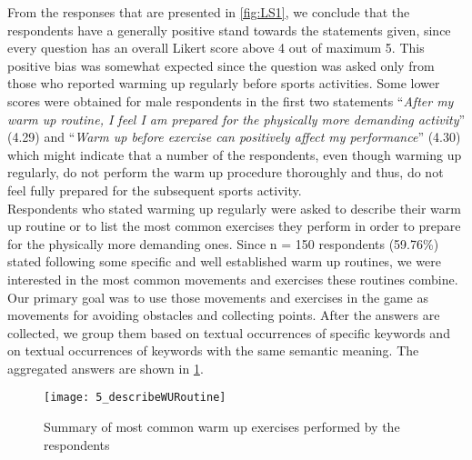 From the responses that are presented in \ref{fig:LS1}, we conclude that the respondents have a generally positive stand towards the statements given, since every question has an overall Likert score above 4 out of maximum 5. This positive bias was somewhat expected since the question was asked only from those who reported warming up regularly before sports activities. Some lower scores were obtained for male respondents in the first two statements ``\textit{After my warm up routine, I feel I am prepared for the physically more demanding activity}'' (4.29) and ``\textit{Warm up before exercise can positively affect my performance}'' (4.30) which might indicate that a number of the respondents, even though warming up regularly, do not perform the warm up procedure thoroughly and thus, do not feel fully prepared for the subsequent sports activity.\\ Respondents who stated warming up regularly were asked to describe their warm up routine or to list the most common exercises they perform in order to prepare for the physically more demanding ones. Since  n = 150 respondents (59.76\%) stated following some specific and well established warm up routines, we were interested in the most common movements and exercises these routines combine. Our primary goal was to use those movements and exercises in the game as movements for avoiding obstacles and collecting points. After the answers are collected, we group them based on textual occurrences of specific keywords and on textual occurrences of keywords with the same semantic meaning. The aggregated answers are shown in \ref{fig:5_describeWURoutine}.
\begin{figure}[h]
    \centering
    \texttt{[image: 5\_describeWURoutine]}
    \caption{Summary of most common warm up exercises performed by the respondents}
    \label{fig:5_describeWURoutine}
\end{figure}\\
